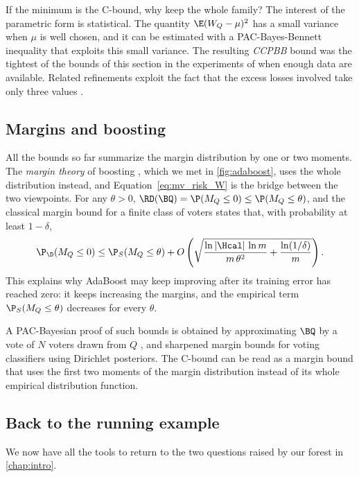 If the minimum is the C-bound, why keep the whole family? The interest of the
parametric form is statistical. The quantity
$\E(W_Q-\mu)^2$ has a small variance when $\mu$ is well chosen, and it can be
estimated with a PAC-Bayes-Bennett inequality that exploits this small
variance. The resulting \emph{CCPBB} bound was the tightest of the bounds of this
section in the experiments of \citet{wu2021chebyshev} when enough data are
available. Related refinements exploit the fact that the excess losses involved
take only three values \citep[split-kl inequality,][]{wu2022split}.

\subsection{Margins and boosting}\label{sec:margins}

All the bounds so far summarize the margin distribution by one or two moments.
The \emph{margin theory} of boosting \citep{schapire1998boosting}, which we met
in \cref{fig:adaboost}, uses the whole distribution instead, and
Equation~\eqref{eq:mv_risk_W} is the bridge between the two viewpoints. For
any $\theta>0$, $\RD(\BQ)=\P(M_Q\leq0)\leq\P(M_Q\leq\theta)$, and the classical
margin bound for a finite class of voters states that, with probability at least
$1-\delta$,
\[
\P_\D(M_Q\leq0)\leq\P_S(M_Q\leq\theta)+O\left(\sqrt{\frac{\ln|\Hcal|\,\ln m}{m\,\theta^2}+\frac{\ln(1/\delta)}{m}}\right).
\]
This explains why AdaBoost may keep improving after its training error has
reached zero: it keeps increasing the margins, and the empirical term
$\P_S(M_Q\leq\theta)$ decreases for every $\theta$.

A PAC-Bayesian proof of such
bounds is obtained by approximating $\BQ$ by a vote of $N$ voters drawn from $Q$
\citep{langford2002pac,mcallester2003simplified}, and \citet{biggs2022margins}
sharpened margin bounds for voting classifiers using Dirichlet posteriors. The
C-bound can be read as a margin bound that uses the first two moments of the
margin distribution instead of its whole empirical distribution function.

\subsection{Back to the running example}

We now have all the tools to return to the two questions raised by our forest
in \cref{chap:intro}.

